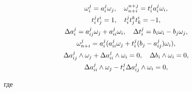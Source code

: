 \begin{gather} 


\omega^j_i=a^j_i\omega_j,\quad 


\omega^{n+j}_{n+i}=t^j_i a^j_i\omega_i,\notag \\ 


% 


t^j_i t^i_j=1,\quad t^j_i t^k_j t^i_k=-1, \notag \\ 


% 


\Delta a^j_i=a^j_{ij}\omega_j+a^j_{ii}\omega_i,\quad 


\Delta t^j_i=b_i\omega_i-b_j\omega_j, \\ 


% 


\omega^j_{n+i}=a^j_i(a^j_{ii}\omega_j+t^j_i(b_j-a^j_{ij} 


)\omega_i), \notag \\ 


% 


\Delta a^j_{ij}\wedge\omega_j+\Delta a^j_{ii} 


\wedge\omega_i=0,\quad \Delta b_i\wedge\omega_i=0,\notag \\ 


% 


\Delta a^j_{ii}\wedge\omega_j-t^j_i\Delta a^j_{ij} 


\wedge\omega_i=0,\notag 


\end{gather} 


где 


